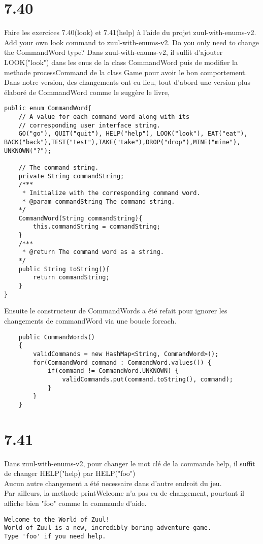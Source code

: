 \documentclass[a4paper , 10pt]{article}
\begin{document}
\section{7.40}
Faire les exercices 7.40(look) et 7.41(help) à l'aide du projet zuul-with-enums-v2.
\\Add your own look command to zuul-with-enums-v2. Do you only need to change the CommandWord type?
\quad Dans zuul-with-enums-v2, il suffit d'ajouter LOOK("look") dans les enus de la class CommandWord puis de modifier la methode processCommand
 de la class Game pour avoir le bon comportement.
\\
Dans notre version, des changements ont eu lieu, tout d'abord une version plus élaboré de CommandWord comme le suggère le livre,
\begin{verbatim}
public enum CommandWord{    
    // A value for each command word along with its
    // corresponding user interface string.
    GO("go"), QUIT("quit"), HELP("help"), LOOK("look"), EAT("eat"), BACK("back"),TEST("test"),TAKE("take"),DROP("drop"),MINE("mine"), UNKNOWN("?");

    // The command string.
    private String commandString;
    /*** 
     * Initialize with the corresponding command word.
     * @param commandString The command string.
    */
    CommandWord(String commandString){
        this.commandString = commandString;
    }
    /*** 
     * @return The command word as a string.
    */
    public String toString(){
        return commandString;
    }
}
\end{verbatim}
Ensuite le constructeur de CommandWords a été refait pour ignorer les changements de commandWord via une boucle foreach.
\begin{verbatim}
    public CommandWords()
    {
        validCommands = new HashMap<String, CommandWord>();
        for(CommandWord command : CommandWord.values()) {
            if(command != CommandWord.UNKNOWN) {
                validCommands.put(command.toString(), command);
            }
        }
    }
\end{verbatim}

\section{7.41}
\quad Dans zuul-with-enums-v2, pour changer le mot clé de la commande help, il suffit de changer HELP("help) par HELP("foo")\\
Aucun autre changement a été necessaire dans d'autre endroit du jeu.\\
Par ailleurs, la methode printWelcome n'a pas eu de changement, pourtant il affiche bien "foo" comme la commande d'aide.
\begin{verbatim}
Welcome to the World of Zuul!
World of Zuul is a new, incredibly boring adventure game.
Type 'foo' if you need help.
\end{verbatim}
\end{document}
